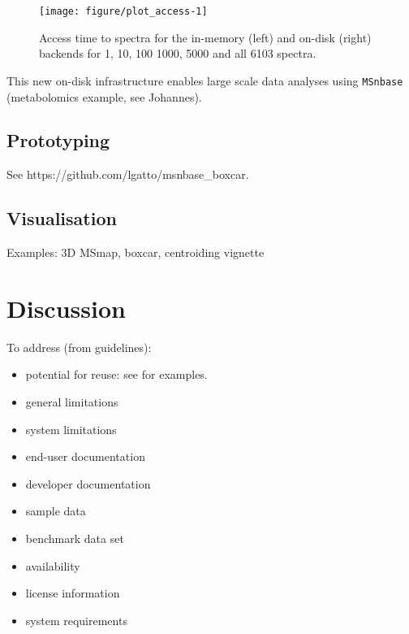\documentclass[journal=jacsat,manuscript=article]{achemso}\usepackage[]{graphicx}\usepackage[]{color}
\newenvironment{knitrout}{}{} %
\begin{document}
\begin{figure}[ht]
  \centering
\begin{knitrout}
\color{fgcolor}
\texttt{[image: figure/plot\_access-1]} 

\end{knitrout}
\caption{Access time to spectra for the in-memory (left) and on-disk
  (right) backends for 1, 10, 100 1000, 5000 and all 6103 spectra.}
\label{fig:access}
\end{figure}


This new on-disk infrastructure enables large scale data analyses
using \texttt{MSnbase} (metabolomics example, see Johannes).

\subsection{Prototyping}

See https://github.com/lgatto/msnbase\_boxcar.

\subsection{Visualisation}

Examples: 3D MSmap, boxcar, centroiding vignette


\section{Discussion}

To address (from guidelines):

\begin{itemize}

\item{potential for reuse}: see
  \cite{Wieczorek:2017,Griss:2019,Smith:2006} for examples.
\item{general limitations}
\item{system limitations}
\item{end-user documentation}
\item{developer documentation}
\item{sample data}
\item{benchmark data set}
\item{availability}
\item{license information}
\item{system requirements}

\end{itemize}
\end{document}
